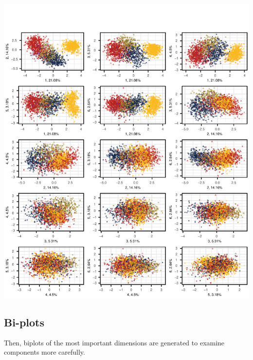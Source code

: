\documentclass[
  letterpaper,
  DIV=11,
  numbers=noendperiod]{scrreprt}
\begin{document}
\includegraphics{AppendixF_files/figure-pdf/PCAtools-pairsplots-TxB-1.pdf}

\subsection{Bi-plots}\label{bi-plots}

Then, biplots of the most important dimensions are generated to examine
components more carefully.
\end{document}
